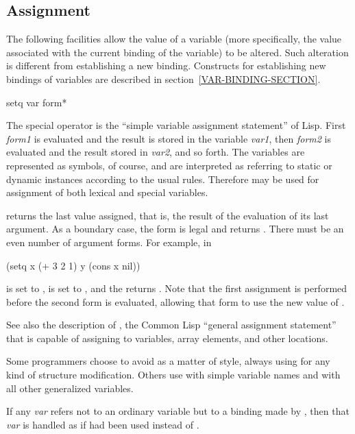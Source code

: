 \subsection{Assignment}

The following facilities allow the value of a variable (more specifically,
the value associated with the current binding of the variable) to be altered.
Such alteration is different from establishing a new binding.
Constructs for establishing new bindings of variables are described
in section~\ref{VAR-BINDING-SECTION}.

\begin{defspec}
setq {var form}*

The special operator  is the
``simple variable assignment statement'' of Lisp.
First \emph{form1} is evaluated
and the result is stored in the variable \emph{var1}, then \emph{form2}
is evaluated and the result stored in \emph{var2}, and so forth.
The variables are represented as symbols, of course, and are interpreted
as referring to static or dynamic instances according to the usual rules.
Therefore  may be used for assignment of both lexical
and special variables.

 returns the last value assigned, that is, the result of the
evaluation of its last argument.
As a boundary case, the form  is legal and returns {\false}.
There must be an even number of argument forms.
For example, in
\begin{lisp}
(setq x (+ 3 2 1) y (cons x nil))
\end{lisp}
 is set to ,  is set to , and the 
returns .  Note that the first assignment is performed before
the second form is evaluated, allowing that form to
use the new value of .

See also the description of ,
the Common Lisp ``general assignment statement'' that is capable of assigning
to variables, array elements, and other locations.

Some programmers choose to avoid
 as a matter of style, always using  for any kind of
structure modification.  Others use  with simple variable names and
 with all other generalized variables.

If any \emph{var}
refers not to an ordinary variable but to a binding made by
, then that \emph{var} is handled as
if  had been used instead of .
\end{defspec}

